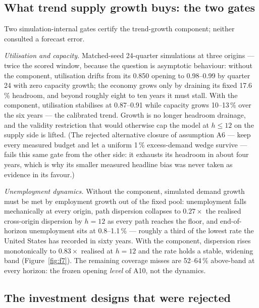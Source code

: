 \documentclass[11pt,a4paper]{article}
\begin{document}
\subsection{What trend supply growth buys: the two gates}
\label{sec:evidence-gates}

Two simulation-internal gates certify the trend-growth component; neither consulted a forecast
error.

\emph{Utilisation and capacity.} Matched-seed 24-quarter simulations at three origins --- twice
the scored window, because the question is asymptotic behaviour: without the component,
utilisation drifts from its 0.850 opening to 0.98--0.99 by quarter 24 with zero capacity growth;
the economy grows only by draining its fixed 17.6\,\% headroom, and beyond roughly eight to ten
years it must stall. With the component, utilisation stabilises at 0.87--0.91 while capacity
grows 10--13\,\% over the six years --- the calibrated trend. Growth is no longer headroom
drainage, and the validity restriction that would otherwise cap the model at $h\le12$ on the
supply side is lifted. (The rejected alternative closure of assumption A6 --- keep every measured
budget and let a uniform 1\,\% excess-demand wedge survive --- fails this same gate from the
other side: it exhausts its headroom in about four years, which is why its smaller measured
headline bias was never taken as evidence in its favour.)

\emph{Unemployment dynamics.} Without the component, simulated demand growth must be met by
employment growth out of the fixed pool: unemployment falls mechanically at every origin, path
dispersion collapses to $0.27\times$ the realised cross-origin dispersion by $h=12$ as every path
reaches the floor, and end-of-horizon unemployment sits at 0.8--1.1\,\% --- roughly a third of
the lowest rate the United States has recorded in sixty years. With the component, dispersion
rises monotonically to $0.83\times$ realised at $h=12$ and the rate holds a stable, widening
band (Figure~\ref{fig:f7}). The remaining coverage misses are 52--64\,\% above-band at every
horizon: the frozen opening \emph{level} of A10, not the dynamics.

\subsection{The investment designs that were rejected}
\label{sec:evidence-invest}
\end{document}
